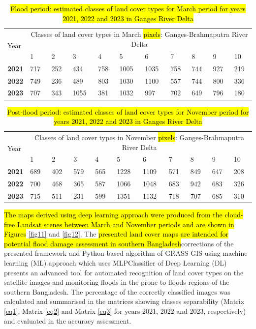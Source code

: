 \documentclass[water,article,submit,pdftex,moreauthors]{Definitions/mdpi}
\begin{document}
\begin{table}[H]
\caption{\hl{Flood period: estimated classes of land cover types for March period for years 2021, 2022 and 2023 in Ganges River Delta}}
  \centering
  \begin{tabularx}{\textwidth}{p{0.9cm}p{0.9cm}p{0.9cm}p{0.9cm}p{0.9cm}p{0.9cm}p{0.9cm}p{0.9cm}p{0.9cm}p{0.9cm}p{0.9cm}}
  \toprule
  \multirow{2}{*}{Year} & \multicolumn{10}{c}{Classes of land cover types in March \hl{pixels}: Ganges-Brahmaputra River Delta} \\
     & 1 & 2 & 3 & 4 & 5 & 6 & 7 & 8 & 9 & 10 \\
    \midrule
    \textbf{2021} & 717 & 252 & 434 & 758 & 1005 & 1035 & 758 & 744 & 927 & 219 \\
    \textbf{2022} &  749 & 236 & 489 & 803 & 1030 & 1100 & 557 & 744 & 800 & 336 \\
     \textbf{2023} &  707 & 343 & 1055 & 381 & 1032 & 997 & 702 & 649 & 796 & 180 \\
\bottomrule
\end{tabularx}
  \label{tab02}
\end{table}

\begin{table}[H]
 \caption{\hl{Post-flood period: estimated classes of land cover types for November period for years 2021, 2022 and 2023 in Ganges River Delta}}
  \centering
  \begin{tabularx}{\textwidth}{p{0.9cm}p{0.9cm}p{0.9cm}p{0.9cm}p{0.9cm}p{0.9cm}p{0.9cm}p{0.9cm}p{0.9cm}p{0.9cm}p{0.9cm}}
  \toprule
  \multirow{2}{*}{Year} & \multicolumn{10}{c}{Classes of land cover types in November \hl{pixels}: Ganges-Brahmaputra River Delta} \\
     & 1 & 2 & 3 & 4 & 5 & 6 & 7 & 8 & 9 & 10 \\
    \midrule
    \textbf{2021} & 689 & 402 & 579 & 565 & 1228 & 1109 & 571 & 849 & 647 & 208 \\
    \textbf{2022} & 700 & 468 & 365 & 587 & 1066 & 1048 & 683 & 942 & 683 & 326 \\
     \textbf{2023} & 715 & 511 & 231 & 599 & 1351 & 1132 & 718 & 707 & 685 & 310 \\
\bottomrule
\end{tabularx}
  \label{tab03}
\end{table}

\hl{The maps derived using deep learning approach were produced from the cloud-free Landsat scenes between March and November periods and are shown in Figures} \ref{fig11} and \ref{fig12}. The \hl{presented land cover maps are intended for potential flood damage assessment in southern Bangladesh}corrections of the presented framework and Python-based algorithm of GRASS GIS using machine learning (ML) approach which uses MLPClassifier of Deep Learning (DL) presents an advanced tool for automated recognition of land cover types on the satellite images and monitoring floods in the prone to floods regions of the southern Bangladesh. The percentage of the correctly classified images was calculated and summarised in the matrices showing classes separability (Matrix \ref{eq1}, Matrix \ref{eq2} and Matrix \ref{eq3} for years 2021, 2022 and 2023, respectively) and evaluated in the accuracy assessment. 
\end{document}
